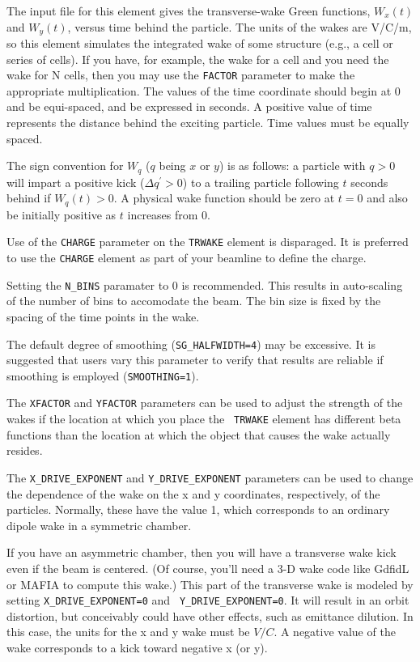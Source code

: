 The input file for this element gives the transverse-wake Green
functions, $W_x(t)$ and $W_y(t)$, versus time behind the particle. The
units of the wakes are V/C/m, so this element simulates the integrated
wake of some structure (e.g., a cell or series of cells).  If you
have, for example, the wake for a cell and you need the wake for N
cells, then you may use the {\tt FACTOR} parameter to make the
appropriate multiplication.  The values of the time coordinate should
begin at 0 and be equi-spaced, and be expressed in seconds.  A positive value of time represents
the distance behind the exciting particle.   Time values must be equally
spaced.

The sign convention for $W_q$ ($q$ being $x$ or $y$) is as follows: a
particle with $q>0$ will impart a positive kick ($\Delta q^\prime >
0$) to a trailing particle following $t$ seconds behind if $W_q(t)>0$.
A physical wake function should be zero at $t=0$ and also be initially
positive as $t$ increases from 0.

Use of the {\tt CHARGE} parameter on the {\tt TRWAKE} element is
disparaged.  It is preferred to use the {\tt CHARGE} element as part
of your beamline to define the charge.  

Setting the {\tt N\_BINS} paramater to 0 is recommended.  This results
in auto-scaling of the number of bins to accomodate the beam.  The bin
size is fixed by the spacing of the time points in the wake.

The default degree of smoothing ({\tt SG\_HALFWIDTH=4}) may be excessive.
It is suggested that users vary this parameter to verify that results
are reliable if smoothing is employed ({\tt SMOOTHING=1}).

The {\tt XFACTOR} and {\tt YFACTOR} parameters can be used to adjust
the strength of the wakes if the location at which you place the {\tt
TRWAKE} element has different beta functions than the location at
which the object that causes the wake actually resides.  

The {\tt X\_DRIVE\_EXPONENT} and {\tt Y\_DRIVE\_EXPONENT} parameters can be used to change the
dependence of the wake on the x and y coordinates, respectively, of the particles.  
Normally, these have the value 1, which corresponds to 
an ordinary dipole wake in a symmetric chamber.  

If you have an asymmetric chamber, then you will have a transverse
wake kick even if the beam is centered.  (Of course, you'll need a 3-D
wake code like GdfidL or MAFIA to compute this wake.)  This part of
the transverse wake is modeled by setting {\tt X\_DRIVE\_EXPONENT=0} and {\tt
Y\_DRIVE\_EXPONENT=0}.  It will result in an orbit distortion, but conceivably
could have other effects, such as emittance dilution.  In this case, 
the units for the x and y wake must be $V/C$.  A negative value of the wake
corresponds to a kick toward negative x (or y).

